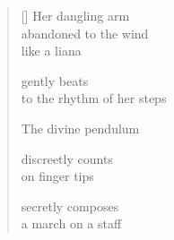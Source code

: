 \documentclass[12pt,a4paper]{article}
\begin{document}
\thispagestyle{empty}

\poemtitle{}

\settowidth{\versewidth}{up to the fluttering measure}

\bigskip

\begin{verse}[\versewidth]
  Her dangling arm \\
  abandoned to the wind \\
  like a liana

  gently beats \\
  to the rhythm of her steps

  The divine pendulum

  discreetly counts \\
  on finger tips

  secretly composes \\
  a march on a staff
  \end{verse}
\end{document}
